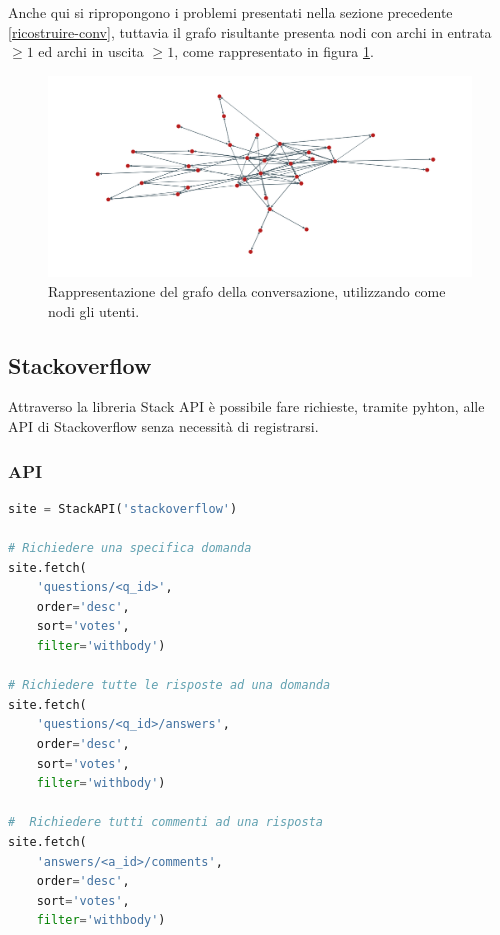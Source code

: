 Anche qui si ripropongono i problemi presentati nella sezione precedente \ref{ricostruire-conv}, tuttavia il grafo risultante presenta nodi con archi in entrata $\geq 1$ ed archi in uscita $\geq 1$, come rappresentato in figura \ref{fig:users-twitter}.

\begin{figure}[H]
    \includegraphics[width=\linewidth]{Immagini/twitter-users.png}
    \caption{Rappresentazione del grafo della conversazione, utilizzando come nodi gli utenti.}
    \label{fig:users-twitter}
\end{figure}





\subsection {Stackoverflow} %
Attraverso la libreria Stack API \cite{stackapi} è possibile fare richieste, tramite pyhton, alle API di Stackoverflow senza necessità di registrarsi.

\subsubsection {API}

\begin{lstlisting}[language=Python, caption=Stack API in Python]
site = StackAPI('stackoverflow')

# Richiedere una specifica domanda
site.fetch(
    'questions/<q_id>', 
    order='desc', 
    sort='votes', 
    filter='withbody')
    
# Richiedere tutte le risposte ad una domanda
site.fetch(
    'questions/<q_id>/answers', 
    order='desc', 
    sort='votes', 
    filter='withbody')

#  Richiedere tutti commenti ad una risposta   
site.fetch(
    'answers/<a_id>/comments', 
    order='desc', 
    sort='votes', 
    filter='withbody')
\end{lstlisting}

